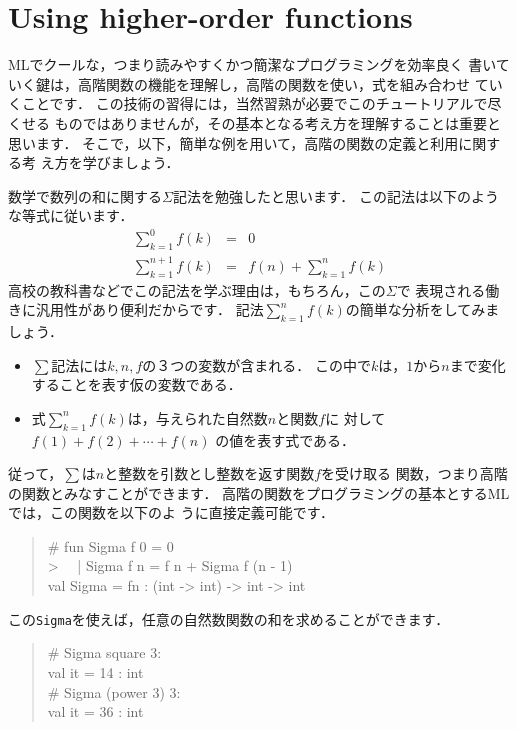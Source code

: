 \documentclass{jbook}
\newcommand{\txt}[2]{#2}
\begin{document}
\section{\txt{高階の関数の利用}{Using higher-order functions}}
\label{sec:tutorialHeigher-order-use}


\ifjp%
	MLでクールな，つまり読みやすくかつ簡潔なプログラミングを効率良く
書いていく鍵は，高階関数の機能を理解し，高階の関数を使い，式を組み合わせ
ていくことです．
	この技術の習得には，当然習熟が必要でこのチュートリアルで尽くせる
ものではありませんが，その基本となる考え方を理解することは重要と思います．
	そこで，以下，簡単な例を用いて，高階の関数の定義と利用に関する考
え方を学びましょう．

	数学で数列の和に関する$\Sigma$記法を勉強したと思います．
	この記法は以下のような等式に従います．
\begin{eqnarray*}
\sum_{k=1}^0 f(k) &=& 0\\
\sum_{k=1}^{n+1} f(k) &=& f(n) + \sum_{k=1}^{n} f(k)
\end{eqnarray*}
	高校の教科書などでこの記法を学ぶ理由は，もちろん，この$\Sigma$で
表現される働きに汎用性があり便利だからです．
	記法$\sum_{k=1}^n f(k)$の簡単な分析をしてみましょう．
\begin{itemize}
\item $\sum$記法には$k,n,f$の３つの変数が含まれる．
この中で$k$は，$1$から$n$まで変化することを表す仮の変数である．
\item 式$\sum_{k=1}^n f(k)$は，与えられた自然数$n$と関数$f$に
対して
$
f(1) + f(2) + \cdots + f(n)
$
の値を表す式である．
\end{itemize}
	従って，$\sum$は$n$と整数を引数とし整数を返す関数$f$を受け取る
関数，つまり高階の関数とみなすことができます．
	高階の関数をプログラミングの基本とするMLでは，この関数を以下のよ
うに直接定義可能です．
\begin{tt}
\begin{quote}
\# fun Sigma f 0 = 0\\
> \ \  | Sigma f n = f n + Sigma f (n - 1)\\
val Sigma = fn : (int -> int) -> int -> int
\end{quote}
\end{tt}
この{\tt Sigma}を使えば，任意の自然数関数の和を求めることができます．
\begin{tt}
\begin{quote}
\# Sigma square 3:\\
val it = 14 : int\\
\# Sigma (power 3) 3:\\
val it = 36 : int
\end{quote}
\end{tt}
\end{document}
